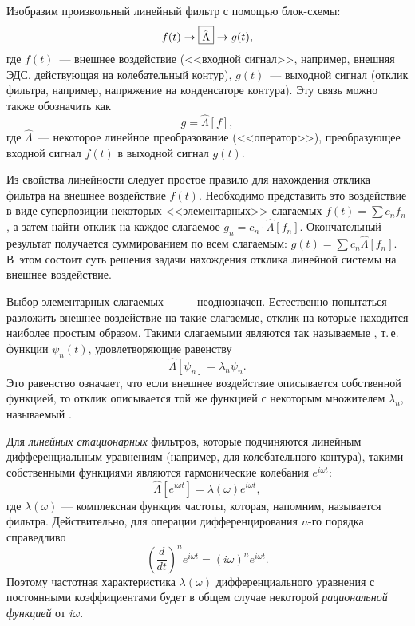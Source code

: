 Изобразим произвольный линейный фильтр с помощью блок-схемы:
\begin{equation*}
f(t)\to\fbox{$\hat\Lambda$} \to g(t),
\end{equation*}
где $f(t)$~--- внешнее воздействие (<<входной сигнал>>, например, внешняя
ЭДС, действующая на колебательный контур), $g(t)$~--- выходной сигнал
(отклик фильтра, например, напряжение на конденсаторе контура).
Эту связь можно также обозначить как
\begin{equation*}
g=\hat\Lambda [f],
\end{equation*}
где $\hat\Lambda$~--- некоторое линейное преобразование (<<оператор>>),
преобразующее входной сигнал $f(t)$ в выходной сигнал $g(t)$.

Из свойства линейности следует простое правило для нахождения
отклика фильтра на  внешнее воздействие $f(t)$.
Необходимо представить это воздействие в виде суперпозиции некоторых
<<элементарных>> слагаемых $f(t)=\sum c_n f_n$, а затем найти отклик на каждое
слагаемое $g_n = c_n \cdot \hat \Lambda [f_n]$. Окончательный результат
получается суммированием по всем слагаемым: $g(t)=\sum c_n \hat\Lambda [f_n]$.
В~этом состоит суть  решения задачи
нахождения отклика линейной системы на внешнее воздействие.

Выбор элементарных слагаемых ---  --- неоднозначен.
Естественно попытаться разложить внешнее воздействие на такие
слагаемые, отклик на которые находится наиболее простым образом. Такими
слагаемыми являются так называемые
, т.\,е. функции $\psi_n(t)$,
удовлетворяющие равенству
\begin{equation}
    \hat \Lambda[\psi_n]=\lambda_n \psi_n.
\end{equation}
Это равенство означает, что если внешнее воздействие описывается собственной
функцией, то отклик описывается той же функцией с некоторым множителем
$\lambda_n$, называемый .

Для \emph{линейных стационарных} фильтров, которые подчиняются линейным
дифференциальным уравнениям (например, для колебательного контура),
такими собственными функциями являются гармонические
колебания $e^{i\omega t}$:
\begin{equation*}
\hat\Lambda\left[e^{i\omega t}\right]=\lambda(\omega)e^{i\omega t},
\end{equation*}
где $\lambda(\omega)$ --- комплексная функция частоты, которая, напомним,
называется  фильтра.
Действительно, для операции дифференцирования $n$-го порядка справедливо
\[
\left(\frac{d}{dt}\right)^n e^{i\omega t} = (i\omega)^n e^{i\omega t}.
\]
Поэтому частотная характеристика $\lambda(\omega)$ дифференциального уравнения
с постоянными коэффициентами будет в общем случае некоторой \emph{рациональной
функцией} от $i\omega$.

